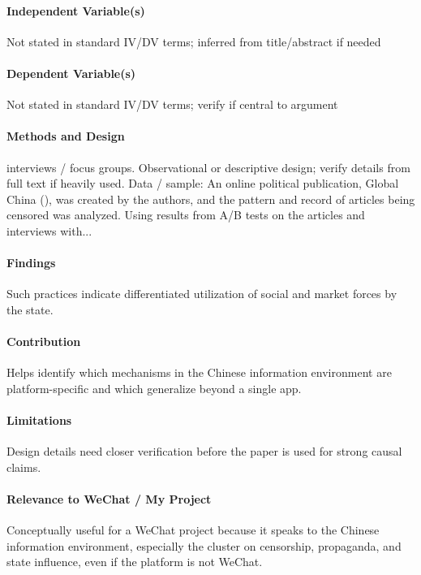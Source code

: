 \documentclass[12pt]{article}
\begin{document}
\paragraph{Independent Variable(s)} Not stated in standard IV/DV terms; inferred from title/abstract if needed

\paragraph{Dependent Variable(s)} Not stated in standard IV/DV terms; verify if central to argument

\paragraph{Methods and Design} interviews / focus groups. Observational or descriptive design; verify details from full text if heavily used. Data / sample: An online political publication, Global China (), was created by the authors, and the pattern and record of articles being censored was analyzed. Using results from A/B tests on the articles and interviews with...

\paragraph{Findings} Such practices indicate differentiated utilization of social and market forces by the state.

\paragraph{Contribution} Helps identify which mechanisms in the Chinese information environment are platform-specific and which generalize beyond a single app.

\paragraph{Limitations} Design details need closer verification before the paper is used for strong causal claims.

\paragraph{Relevance to WeChat / My Project} Conceptually useful for a WeChat project because it speaks to the Chinese information environment, especially the cluster on censorship, propaganda, and state influence, even if the platform is not WeChat.
\end{document}
